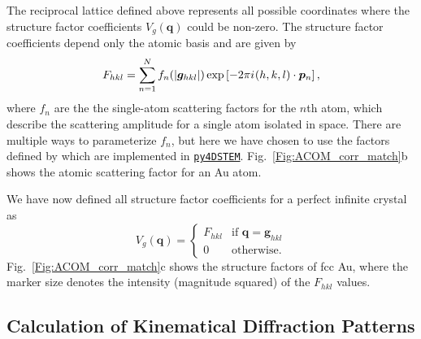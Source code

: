 \documentclass[%
 superscriptaddress,
 aip,
 amsmath,amssymb,
reprint,%
 author-year,%
longbibliography
]{revtex4-2}
\newcommand{\ii}{{i\mkern1mu}}
\newcommand{\pyFDSTEM}{\href{https://github.com/py4dstem/py4DSTEM}{\texttt{py4DSTEM}}}
\begin{document}
The reciprocal lattice defined above represents all possible coordinates where the structure factor coefficients $V_g(\bm{q})$ could be non-zero. The structure factor coefficients depend only the atomic basis and are given by
\begin{equation}
    F_{hkl} = 
    \sum_{n=1}^N 
    f_n(|\bm{g}_{hkl}|)
    \exp\left[
    -2 \pi \ii (h,k,l) \cdot \bm{p}_n
    \right],
\end{equation}
where $f_n$ are the the single-atom scattering factors for the $n$th atom, which describe the scattering amplitude for a single atom isolated in space. There are multiple ways to parameterize $f_n$, but here we have chosen to use the factors defined by \cite{lobato2014accurate} which are implemented in \pyFDSTEM{}. Fig.~\ref{Fig:ACOM_corr_match}b shows the atomic scattering factor for an Au atom.



We have now defined all structure factor coefficients for a perfect infinite crystal as
\begin{equation}
  V_g(\bm{q}) =
  \begin{cases}
    F_{hkl} & \text{if $\bm{q} = \bm{g}_{hkl}$} 
    \\
    0 & \text{otherwise}.
  \end{cases}
\end{equation}
Fig.~\ref{Fig:ACOM_corr_match}c shows the structure factors of fcc Au, where the marker size denotes the intensity (magnitude squared) of the $F_{hkl}$ values.







\subsection*{Calculation of Kinematical Diffraction Patterns}
\end{document}
